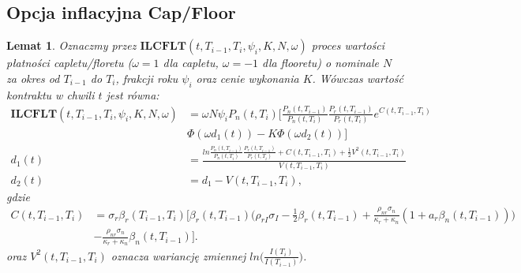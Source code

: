 \documentclass{mini}
\theoremstyle{mythstyle}
\newtheorem{Lemat}{Lemat}[chapter]
\begin{document}
	\subsection{Opcja inflacyjna Cap/Floor}
	\begin{Lemat}
		Oznaczmy przez $\mathbf{ILCFLT}(t,T_{i-1},T_i,\psi_i,K,N,\omega)$ proces wartości płatności capletu/floretu ($\omega =1$ dla capletu, $\omega = -1$ dla flooretu) o nominale $N$ za okres od $T_{i-1}$ do $T_i$, frakcji roku $\psi_i$ oraz cenie wykonania $K$. Wówczas wartość kontraktu w chwili $t$ jest równa: 
		\begin{align*}
		\mathbf{ILCFLT}(t,T_{i-1},T_i,\psi_i,K,N,\omega) &= \omega N\psi_iP_n(t,T_i)\bigg[ \frac{P_n(t,T_{i-1})}{P_n(t,T_i)} \frac{P_r(t,T_{i-1})}{P_r(t,T_i)} e^{C(t,T_{i-1},T_i)} \\ &\Phi(\omega d_1(t)) - K\Phi(\omega d_2(t))\bigg] \\
		d_1(t) &= \frac{ln \frac{P_n(t,T_{i-1})}{P_n(t,T_i)} \frac{P_r(t,T_{i-1})}{P_r(t,T_i)} + C(t,T_{i-1},T_i) + \frac{1}{2} V^2(t,T_{i-1},T_i)}{V(t,T_{i-1},T_i)}\\
		d_2(t)&= d_1 - V(t,T_{i-1},T_i),
		\end{align*}
		gdzie 
		\begin{align*}
		C(t,T_{i-1},T_i) &= \sigma_r\beta_r(T_{i-1},T_i) \bigg[ \beta_r(t,T_{i-1}) \bigg( \rho_{rI}\sigma_I - \frac{1}{2} \beta_r (t,T_{i-1}) 
		+ \frac{\rho_{nr}\sigma_n}{\kappa_r + \kappa_n} (1+a_r\beta_n(t,T_{i-1})) \bigg)\\&-  \frac{\rho_{nr}\sigma_n}{\kappa_r + \kappa_n} \beta_n(t,T_{i-1}) \bigg].
		\end{align*}
		oraz $V^2(t,T_{i-1},T_i)$ oznacza wariancję zmiennej $ln\bigg(\frac{I(T_i)}{I(T_{i-1})}\bigg)$.
	\end{Lemat}
\end{document}
